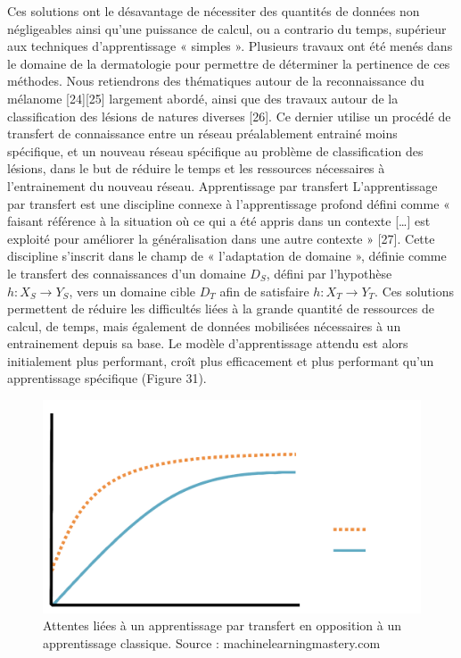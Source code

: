 Ces solutions ont le désavantage de nécessiter des quantités de données non négligeables ainsi qu’une puissance de calcul, ou a contrario du temps, supérieur aux techniques d’apprentissage « simples ».
Plusieurs travaux ont été menés dans le domaine de la dermatologie pour permettre de déterminer la pertinence de ces méthodes. Nous retiendrons des thématiques autour de la reconnaissance du mélanome [24][25] largement abordé, ainsi que des travaux autour de la classification des lésions de natures diverses [26]. Ce dernier utilise un procédé de transfert de connaissance entre un réseau préalablement entrainé moins spécifique, et un nouveau réseau spécifique au problème de classification des lésions, dans le but de réduire le temps et les ressources nécessaires à l’entrainement du nouveau réseau.
Apprentissage par transfert
L’apprentissage par transfert est une discipline connexe à l’apprentissage profond défini comme « faisant référence à la situation où ce qui a été appris dans un contexte […] est exploité pour améliorer la généralisation dans une autre contexte » [27]. Cette discipline s’inscrit dans le champ de « l’adaptation de domaine », définie comme le transfert des connaissances d’un domaine $D_S$, défini par l’hypothèse $h: X_S \rightarrow Y_S$, vers un domaine cible $D_T$ afin de satisfaire $h: X_T \rightarrow Y_T$.
Ces solutions permettent de réduire les difficultés liées à la grande quantité de ressources de calcul, de temps, mais également de données mobilisées nécessaires à un entrainement depuis sa base. Le modèle d’apprentissage attendu est alors initialement plus performant, croît plus efficacement et plus performant qu’un apprentissage spécifique (Figure 31).

\begin{figure}[H]
    \centering
    \includegraphics[width=\linewidth]{contents/chapter_3/resources/DeepLearningCurves.png}
    \caption{ Attentes liées à un apprentissage par transfert en opposition à un apprentissage classique. Source : machinelearningmastery.com}
    \label{fig:deep_understanding}
\end{figure}

